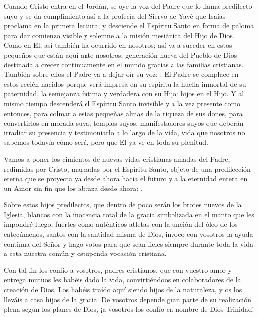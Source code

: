 \begin{body}
\begin{body}
{Cuando Cristo entra en el Jordán, se oye la voz del Padre que lo llama predilecto suyo y se da cumplimiento así a la profecía del Siervo de Yavé que Isaías proclama en la primera lectura; y desciende el Espíritu Santo en forma de paloma para dar comienzo visible y solemne a la misión mesiánica del Hijo de Dios. Como en El, así también ha ocurrido en nosotros; así va a suceder en estos pequeños que están aquí ante nosotros, generación nueva del Pueblo de Dios destinada a crecer continuamente en el mundo gracias a las familias cristianas. También sobre ellos el Padre va a dejar oír su voz: . El Padre se complace en estos recién nacidos porque verá impresa en su espíritu la huella inmortal de su paternidad, la semejanza íntima y verdadera con su Hijo: hijos en el Hijo. Y al mismo tiempo descenderá el Espíritu Santo invisible y a la vez presente como entonces, para colmar a estas pequeñas almas de la riqueza de sus dones, para convertirlos en morada suya, templos suyos, manifestadores suyos que deberán irradiar su presencia y testimoniarlo a lo largo de la vida, vida que nosotros no sabemos todavía cómo será, pero que El ya ve en toda su plenitud.

Vamos a poner los cimientos de nuevas vidas cristianas amadas del Padre, redimidas por Cristo, marcadas por el Espíritu Santo, objeto de una predilección eterna que se proyecta ya desde ahora hacia el futuro y a la eternidad entera en un Amor sin fin que los abraza desde ahora: .

Sobre estos hijos predilectos, que dentro de poco serán los brotes nuevos de la Iglesia, blancos con la inocencia total de la gracia simbolizada en el manto que les impondré luego, fuertes como auténticos atletas con la unción del óleo de los catecúmenos, santos con la santidad misma de Dios, invoco con vosotros la ayuda continua del Señor y hago votos para que sean fieles siempre durante toda la vida a esta nuestra común y estupenda vocación cristiana.

Con tal fin los confío a vosotros, padres cristianos, que con vuestro amor y entrega mutuos les habéis dado la vida, convirtiéndoos en colaboradores de la creación de Dios. Los habéis traído aquí siendo hijos de la naturaleza, y os los lleváis a casa hijos de la gracia. De vosotros depende gran parte de su realización plena según los planes de Dios, ¡a vosotros los confío en nombre de Dios Trinidad!

}
\end{body}
\end{body}
